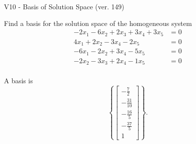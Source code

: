 \begin{exercise}
  \begin{exerciseTitle}V10 - Basis of Solution Space (ver. 149)\end{exerciseTitle}
  \begin{exerciseStatement}
    Find a basis for the solution space of the homogeneous system 
\begin{align*}
 -2 x_ 1 -6 x_ 2 + 2 x_ 3 + 3 x_ 4 + 3 x_ 5 &= 0  \\ 
  4 x_ 1 + 2 x_ 2 -3 x_ 4 -2 x_ 5 &= 0  \\ 
  -6 x_ 1 -2 x_ 2 + 3 x_ 4 -5 x_ 5 &= 0  \\ 
  -2 x_ 2 -3 x_ 3 + 2 x_ 4 -1 x_ 5 &= 0  \\ 
 \end{align*}


 
  \end{exerciseStatement}

  \begin{exerciseAnswer}
   A basis is   
\[\left\{\left[\begin{array}{c}
-\frac{7}{2} \\
-\frac{31}{10} \\
-\frac{16}{5} \\
-\frac{37}{5} \\
1
\end{array}\right]\right\}.\]

  


  \end{exerciseAnswer}
\end{exercise}